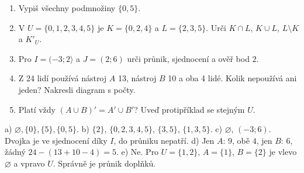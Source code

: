 \documentclass[11pt,a4paper]{article}
\begin{document}
\begin{zadaniReseniBox}[title={D1: 12–18 minut}]
\begin{enumerate}[label=\alph*)]
\item Vypiš všechny podmnožiny $\{0,5\}$.
\item V $U=\{0,1,2,3,4,5\}$ je $K=\{0,2,4\}$ a $L=\{2,3,5\}$.
Urči $K\cap L$, $K\cup L$, $L\setminus K$ a $K'_U$.
\item Pro $I=(-3;2\rangle$ a $J=(2;6)$ urči průnik, sjednocení a ověř bod $2$.
\item Z 24 lidí používá nástroj $A$ 13, nástroj $B$ 10 a oba 4 lidé.
Kolik nepoužívá ani jeden? Nakresli diagram s počty.
\item Platí vždy $(A\cup B)'=A'\cup B'$? Uveď protipříklad se stejným $U$.
\end{enumerate}
\tcblower
a) $\varnothing,\{0\},\{5\},\{0,5\}$.
b) $\{2\}$, $\{0,2,3,4,5\}$, $\{3,5\}$, $\{1,3,5\}$.
c) $\varnothing$, $(-3;6)$. Dvojka je ve sjednocení díky $I$, do průniku nepatří.
d) Jen $A$: $9$, obě $4$, jen $B$: $6$, žádný $24-(13+10-4)=5$.
e) Ne. Pro $U=\{1,2\}$, $A=\{1\}$, $B=\{2\}$ je vlevo
$\varnothing$ a vpravo $U$. Správně je průnik doplňků.
\end{zadaniReseniBox}
\end{document}
